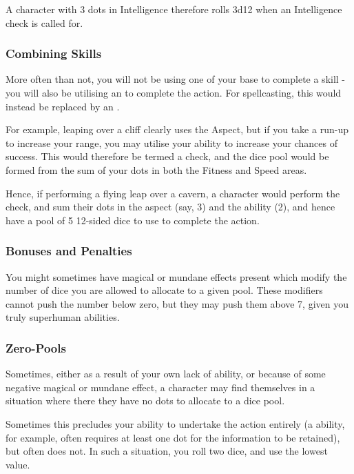 A character with 3 dots in Intelligence therefore rolls 3d12 when an Intelligence check is called for. 

\subsubsection{Combining Skills}

More often than not, you will not be using one of your base  to complete a skill - you will also be utilising an  to complete the action. For spellcasting, this would instead be replaced by an . 

For example, leaping over a cliff clearly uses the  Aspect, but if you take a run-up to increase your range, you may utilise your  ability to increase your chances of success. This would therefore be termed a  check, and the dice pool would be formed from the sum of your dots in both the Fitness and Speed areas.

Hence, if performing a flying leap over a cavern, a character would perform the  check, and sum their dots in the  aspect (say, 3) and the  ability (2), and hence have a pool of 5 12-sided dice to use to complete the action. 

\subsubsection{Bonuses and Penalties}

You might sometimes have magical or mundane effects present which modify the number of dice you are allowed to allocate to a given pool. These modifiers cannot push the number below zero, but they may push them above 7, given you truly superhuman abilities.


\subsubsection{Zero-Pools}

Sometimes, either as a result of your own lack of ability, or because of some negative magical or mundane effect, a character may find themselves in a situation where there they have no dots to allocate to a dice pool. 

Sometimes this precludes your ability to undertake the action entirely (a  ability, for example, often requires at least one dot for the information to be retained), but often does not. In such a situation, you roll two dice, and use the lowest value. 


